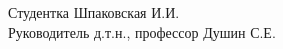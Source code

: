 \begin{flushleft}
 Студентка \hspace{6cm} \underline{\hspace{3cm}} \hspace{1cm}  Шпаковская И.И. \\ 
 \vspace{5mm}
 Руководитель \hspace{0,5cm} д.т.н., профессор \hspace{1cm} \underline{\hspace{3cm}}\hspace{1cm}  Душин С.Е.\\ 
\end{flushleft}

\thispagestyle{empty} %
